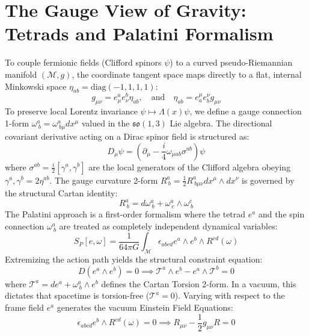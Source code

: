 \documentclass[11pt,a4paper]{article}
\begin{document}
\section{The Gauge View of Gravity: Tetrads and Palatini Formalism}
To couple fermionic fields (Clifford spinors $\psi$) to a curved pseudo-Riemannian manifold $(\mathcal{M}, g)$, the coordinate tangent space maps directly to a flat, internal Minkowski space $\eta_{ab} = \text{diag}(-1,1,1,1)$:
\begin{equation}
g_{\mu\nu} = e^a_{\mu} e^b_{\nu} \eta_{ab}, \quad \text{and} \quad \eta_{ab} = e_a^{\mu} e_b^{\nu} g_{\mu\nu}
\end{equation}
To preserve local Lorentz invariance $\psi \mapsto \Lambda(x)\psi$, we define a gauge connection 1-form $\omega^a_{\ b} = \omega^a_{\ b\mu} dx^{\mu}$ valued in the $\mathfrak{so}(1,3)$ Lie algebra. The directional covariant derivative acting on a Dirac spinor field is structured as:
\begin{equation}
D_{\mu} \psi = \left( \partial_{\mu} - \frac{i}{4} \omega_{\mu ab} \sigma^{ab} \right) \psi
\end{equation}
where $\sigma^{ab} = \frac{i}{2}[\gamma^a, \gamma^b]$ are the local generators of the Clifford algebra obeying ${\gamma^a, \gamma^b} = 2\eta^{ab}$. The gauge curvature 2-form $R^a_{\ b} = \frac{1}{2} R^a_{\ b\mu\nu} dx^{\mu} \wedge dx^{\nu}$ is governed by the structural Cartan identity:
\begin{equation}
R^a_{\ b} = d\omega^a_{\ b} + \omega^a_{\ c} \wedge \omega^c_{\ b}
\end{equation}
The Palatini approach is a first-order formalism where the tetrad $e^a$ and the spin connection $\omega^a_{\ b}$ are treated as completely independent dynamical variables:
\begin{equation}
S_P[e, \omega] = \frac{1}{64\pi G} \int_{\mathcal{M}} \epsilon_{abcd} e^a \wedge e^b \wedge R^{cd}(\omega)
\end{equation}
Extremizing the action path yields the structural constraint equation:
\begin{equation}
D(e^a \wedge e^b) = 0 \implies \mathcal{T}^a \wedge e^b - e^a \wedge \mathcal{T}^b = 0
\end{equation}
where $\mathcal{T}^a = de^a + \omega^a_{\ b} \wedge e^b$ defines the Cartan Torsion 2-form. In a vacuum, this dictates that spacetime is torsion-free ($\mathcal{T}^a = 0$). Varying with respect to the frame field $e^a$ generates the vacuum Einstein Field Equations:
\begin{equation}
\epsilon_{abcd} e^b \wedge R^{cd}(\omega) = 0 \implies R_{\mu\nu} - \frac{1}{2}g_{\mu\nu}R = 0
\end{equation}
\end{document}
